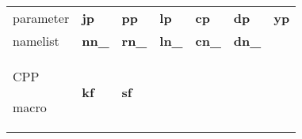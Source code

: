 \begin{table}[htbp]
\begin{center}
\begin{tabular}{|p{50pt}|p{50pt}|p{50pt}|p{50pt}|p{50pt}|p{50pt}|p{50pt}|}
                                                                                                  &
                                                                                                  \\
      \hline
      parameter                                                                                   &
      \textbf{jp}                                                                                 &
      \textbf{pp}                                                                                 &
      \textbf{lp}                                                                                 &
      \textbf{cp}                                                                                 &
      \textbf{dp}                                                                                 &
      \textbf{yp}                                                                                 \\
      \hline
      namelist                                                                                    &
      \textbf{nn\_}                                                                               &
      \textbf{rn\_}                                                                               &
      \textbf{ln\_}                                                                               &
      \textbf{cn\_}                                                                               &
      \textbf{dn\_}                                                                               &
                                                                                                  \\
      \hline
      CPP \par macro                                                                              &
      \textbf{kf}                                                                                 &
      \textbf{sf}                                                                                 &
                                                                                                  &
                                                                                                  &
                                                                                                  &
                                                                                                  \\
      \hline
    \end{tabular}
    \label{tab1}
  \end{center}
\end{table}

